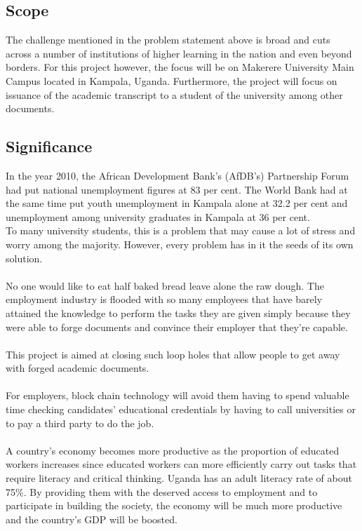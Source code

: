 \subsection{Scope}

The challenge mentioned in the problem statement above is broad and cuts across a number of institutions of higher learning in the nation and even beyond borders. For this project however, the focus will be on Makerere University Main Campus located in Kampala, Uganda. Furthermore, the project will focus on issuance of the academic transcript to a student of the university among other documents.

\subsection{Significance}
In the year 2010, the African Development Bank’s (AfDB’s) Partnership Forum had put national unemployment figures at 83 per cent. The World Bank had at the same time put youth unemployment in Kampala alone at 32.2 per cent and unemployment among university graduates in Kampala at 36 per cent.\cite{art12}\\
To many university students, this is a problem that may cause a lot of stress and worry among the majority. However, every problem has in it the seeds of its own solution.\\\\
No one would like to eat half baked bread leave alone the raw dough. The employment industry is flooded with so many employees that have barely attained the knowledge to perform the tasks they are given simply because they were able to forge documents and convince their employer that they’re capable. \\\\
This project is aimed at closing such loop holes that allow people to get away with forged academic documents.\\\\
For employers, block chain technology will avoid them having to spend valuable time checking candidates' educational credentials by having to call universities or to pay a third party to do the job. \\\\
A country's economy becomes more productive as the proportion  of educated workers increases since educated workers can more efficiently carry out tasks that require literacy and critical thinking.
Uganda has an adult literacy rate of about 75\%. By providing them with the deserved access to employment and to participate in building the society, the economy will be much more productive and the country's GDP will be
boosted.